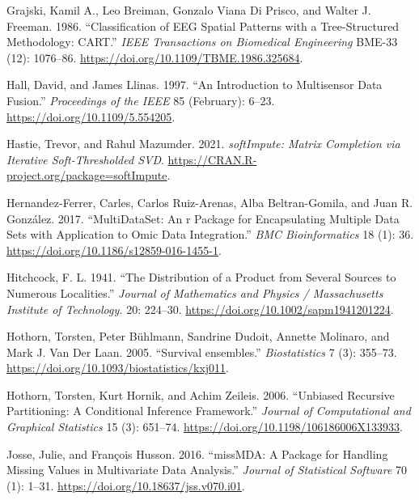 \begin{CSLReferences}{1}{0}
\leavevmode{}%
Grajski, Kamil A., Leo Breiman, Gonzalo Viana Di Prisco, and Walter J. Freeman. 1986. {``Classification of EEG Spatial Patterns with a Tree-Structured Methodology: CART.''} \emph{IEEE Transactions on Biomedical Engineering} BME-33 (12): 1076--86. \url{https://doi.org/10.1109/TBME.1986.325684}.

\leavevmode{}%
Hall, David, and James Llinas. 1997. {``An Introduction to Multisensor Data Fusion.''} \emph{Proceedings of the IEEE} 85 (February): 6--23. \url{https://doi.org/10.1109/5.554205}.

\leavevmode{}%
Hastie, Trevor, and Rahul Mazumder. 2021. \emph{softImpute: Matrix Completion via Iterative Soft-Thresholded SVD}. \url{https://CRAN.R-project.org/package=softImpute}.

\leavevmode{}%
Hernandez-Ferrer, Carles, Carlos Ruiz-Arenas, Alba Beltran-Gomila, and Juan R. González. 2017. {``MultiDataSet: An r Package for Encapsulating Multiple Data Sets with Application to Omic Data Integration.''} \emph{BMC Bioinformatics} 18 (1): 36. \url{https://doi.org/10.1186/s12859-016-1455-1}.

\leavevmode{}%
Hitchcock, F. L. 1941. {``The Distribution of a Product from Several Sources to Numerous Localities.''} \emph{Journal of Mathematics and Physics / Massachusetts Institute of Technology.} 20: 224--30. \url{https://doi.org/10.1002/sapm1941201224}.

\leavevmode{}%
Hothorn, Torsten, Peter Bühlmann, Sandrine Dudoit, Annette Molinaro, and Mark J. Van Der Laan. 2005. {``{Survival ensembles}.''} \emph{Biostatistics} 7 (3): 355--73. \url{https://doi.org/10.1093/biostatistics/kxj011}.

\leavevmode{}%
Hothorn, Torsten, Kurt Hornik, and Achim Zeileis. 2006. {``Unbiased Recursive Partitioning: A Conditional Inference Framework.''} \emph{Journal of Computational and Graphical Statistics} 15 (3): 651--74. \url{https://doi.org/10.1198/106186006X133933}.

\leavevmode{}%
Josse, Julie, and François Husson. 2016. {``{missMDA}: A Package for Handling Missing Values in Multivariate Data Analysis.''} \emph{Journal of Statistical Software} 70 (1): 1--31. \url{https://doi.org/10.18637/jss.v070.i01}.


\end{CSLReferences}
